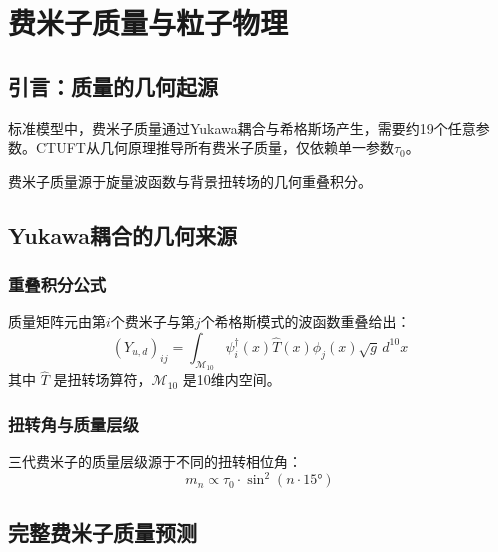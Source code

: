 \section{费米子质量与粒子物理}
\label{sec:fermion_physics}
\label{sec:fermion_physics}

\subsection{引言：质量的几何起源}

标准模型中，费米子质量通过Yukawa耦合与希格斯场产生，需要约19个任意参数。CTUFT从几何原理推导所有费米子质量，仅依赖单一参数$\tau_0$。

\begin{insight}[质量作为几何重叠]
费米子质量源于旋量波函数与背景扭转场的几何重叠积分。
\end{insight}

\subsection{Yukawa耦合的几何来源}

\subsubsection{重叠积分公式}

\begin{theorem}[几何Yukawa耦合]
质量矩阵元由第$i$个费米子与第$j$个希格斯模式的波函数重叠给出：
\begin{equation}
    (Y_{u,d})_{ij} = \int_{\mathcal{M}_{10}} \psi_i^{\dagger}(x) \hat{T}(x) \phi_j(x) \sqrt{g} \, d^{10}x
\end{equation}
其中 $\hat{T}$ 是扭转场算符，$\mathcal{M}_{10}$ 是10维内空间。
\end{theorem}

\subsubsection{扭转角与质量层级}

三代费米子的质量层级源于不同的扭转相位角：
\begin{equation}
    m_n \propto \tau_0 \cdot \sin^2(n \cdot 15°)
\end{equation}

\subsection{完整费米子质量预测}

